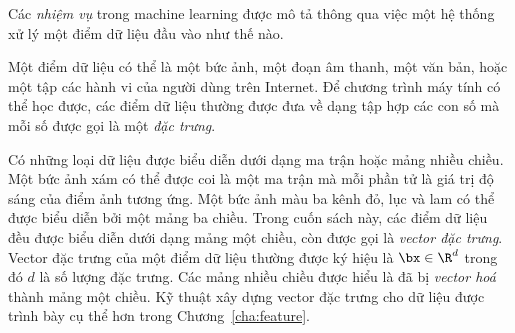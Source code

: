 Các \textit{nhiệm vụ} trong machine learning được mô tả thông qua việc
một hệ thống xử lý một điểm dữ liệu đầu vào như thế nào. 

Một điểm dữ liệu có thể là một bức ảnh, một đoạn âm thanh, một văn bản, hoặc một
tập các hành vi của người dùng trên Internet. Để chương trình máy tính có thể
học được, các điểm dữ liệu thường được đưa về dạng tập hợp các con số mà mỗi số
được gọi là một \textit{đặc trưng}.


Có những loại dữ liệu được biểu diễn dưới dạng ma trận hoặc mảng nhiều chiều.
Một bức ảnh xám có thể được coi là một ma trận mà mỗi phần tử là giá trị độ sáng
của điểm ảnh tương ứng. Một bức ảnh màu ba kênh đỏ, lục và lam có thể được biểu
diễn bởi một mảng ba chiều. Trong cuốn sách này, các điểm dữ liệu đều được biểu
diễn dưới dạng mảng một chiều, còn được gọi là \textit{vector đặc trưng}. Vector đặc trưng của một điểm dữ liệu thường được ký hiệu là $\bx \in \R^d$ trong đó $d$ là số lượng đặc trưng. Các mảng nhiều chiều được hiểu là đã bị \textit{vector hoá} thành mảng một chiều. Kỹ thuật xây dựng vector đặc trưng cho dữ liệu được trình bày cụ thể hơn trong Chương~\ref{cha:feature}.



